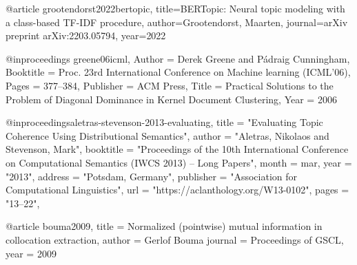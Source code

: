 @article{
	grootendorst2022bertopic,
	title={BERTopic: Neural topic modeling with a class-based TF-IDF procedure},
	author={Grootendorst, Maarten},
	journal={arXiv preprint arXiv:2203.05794},
	year={2022}
}

@inproceedings{
	greene06icml,
	Author = {Derek Greene and P\'{a}draig Cunningham},
	Booktitle = {Proc. 23rd International Conference on Machine learning (ICML'06)},
	Pages = {377--384},
	Publisher = {ACM Press},
	Title = {Practical Solutions to the Problem of Diagonal Dominance in Kernel Document Clustering},
	Year = {2006}
}


@inproceedings{aletras-stevenson-2013-evaluating,
    title = "Evaluating Topic Coherence Using Distributional Semantics",
    author = "Aletras, Nikolaos  and Stevenson, Mark",
    booktitle = "Proceedings of the 10th International Conference on Computational Semantics ({IWCS} 2013) {--} Long Papers",
    month = mar,
    year = "2013",
    address = "Potsdam, Germany",
    publisher = "Association for Computational Linguistics",
    url = "https://aclanthology.org/W13-0102",
    pages = "13--22",
}

@article{
	bouma2009,
	title = {Normalized (pointwise) mutual information in collocation extraction},
	author = {Gerlof Bouma}
	journal = {Proceedings of GSCL},
	year = {2009}
}
